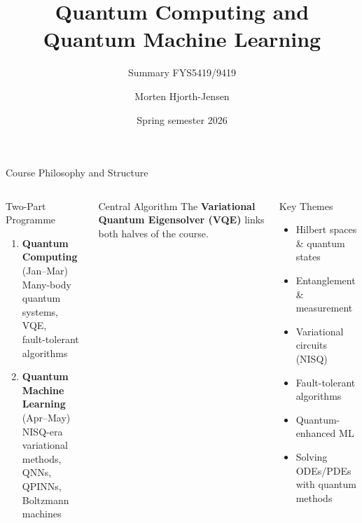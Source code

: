 \documentclass[aspectratio=169,12pt]{beamer}
\title{Quantum Computing and Quantum Machine Learning}
\subtitle{Summary FYS5419/9419}
\author{Morten Hjorth-Jensen}
\institute{Department of Physics, University of Oslo}
\date{Spring semester 2026}
\begin{document}
\begin{frame}[plain]
  \titlepage
\end{frame}

\begin{frame}{Course Philosophy and Structure}
  \begin{columns}[T]
      \begin{block}{Two-Part Programme}
        \begin{enumerate}
          \item \textbf{Quantum Computing} (Jan--Mar)\\
                Many-body quantum systems, VQE,\\
                fault-tolerant algorithms
          \item \textbf{Quantum Machine Learning} (Apr--May)\\
                NISQ-era variational methods,\\
                QNNs, QPINNs, Boltzmann machines
        \end{enumerate}
      \end{block}
      \vspace{4pt}
      \begin{alertblock}{Central Algorithm}
        The \textbf{Variational Quantum Eigensolver (VQE)}
        links both halves of the course.
      \end{alertblock}
      \begin{block}{Key Themes}
        \begin{itemize}
          \item Hilbert spaces \& quantum states
          \item Entanglement \& measurement
          \item Variational circuits (NISQ)
          \item Fault-tolerant algorithms
          \item Quantum-enhanced ML
          \item Solving ODEs/PDEs with quantum methods
        \end{itemize}
      \end{block}
  \end{columns}
\end{frame}
\end{document}
